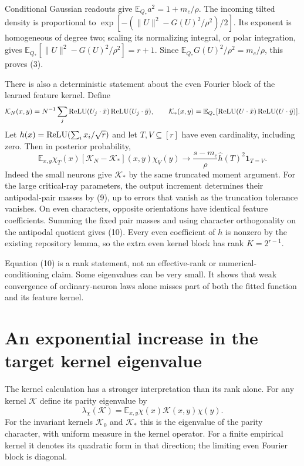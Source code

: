 \documentclass[11pt]{article}
\newcommand{\E}{\mathbb E}\newcommand{\Pp}{\mathbb P}
\newcommand{\one}{\mathbf1}
\begin{document}
Conditional Gaussian readouts give
$\E_{Q_*}a^2=1+m_c/\rho$. The incoming tilted density is proportional
to $\exp[-(\|U\|^2-G(U)^2/\rho^2)/2]$.
Its exponent is homogeneous of degree two; scaling its normalizing
integral, or polar integration, gives
$\E_{Q_*}[\|U\|^2-G(U)^2/\rho^2]=r+1$.
Since $\E_{Q_*}G(U)^2/\rho^2=m_c/\rho$, this proves (3).

There is also a deterministic statement about the even Fourier block
of the learned feature kernel. Define
\[
 \mathcal K_N(x,y)=N^{-1}\sum_j
       \relu(U_j\cdot\bar x)\relu(U_j\cdot\bar y),\qquad
 \mathcal K_*(x,y)=\E_{Q_*}
       [\relu(U\cdot\bar x)\relu(U\cdot\bar y)].
\]
Let $h(x)=\operatorname{ReLU}(\sum_i x_i/\sqrt r)$ and let $T,V\subseteq[r]$
have even cardinality, including zero. Then in posterior probability,
\[
 \E_{x,y}\chi_T(x)[\mathcal K_N-\mathcal K_*](x,y)\chi_V(y)
 \longrightarrow
 \frac{s-m_c}{\rho}\widehat h(T)^2\one_{T=V}.              \tag{10}
\]
Indeed the small neurons give $\mathcal K_*$ by the same truncated
moment argument. For the large critical-ray parameters, the output
increment determines their antipodal-pair masses by (9), up to errors
that vanish as the truncation tolerance vanishes. On even characters,
opposite orientations have identical feature coefficients. Summing
the fixed pair masses and using character orthogonality on the
antipodal quotient gives (10). Every even coefficient of $h$ is
nonzero by the existing repository lemma, so the extra even kernel
block has rank $K=2^{r-1}$.

Equation (10) is a rank statement, not an effective-rank or numerical-
conditioning claim. Some eigenvalues can be very small. It shows that
weak convergence of ordinary-neuron laws alone misses part of both
the fitted function and its feature kernel.

\section{An exponential increase in the target kernel eigenvalue}
The kernel calculation has a stronger interpretation than its rank alone.
For any kernel $\mathcal K$ define its parity eigenvalue by
\[
 \lambda_\chi(\mathcal K)=\E_{x,y}\chi(x)\mathcal K(x,y)\chi(y).
\]
For the invariant kernels $\mathcal K_0$ and $\mathcal K_*$ this is
the eigenvalue of the parity character, with uniform measure in the
kernel operator. For a finite empirical kernel it denotes its quadratic
form in that direction; the limiting even Fourier block is diagonal.
\end{document}
